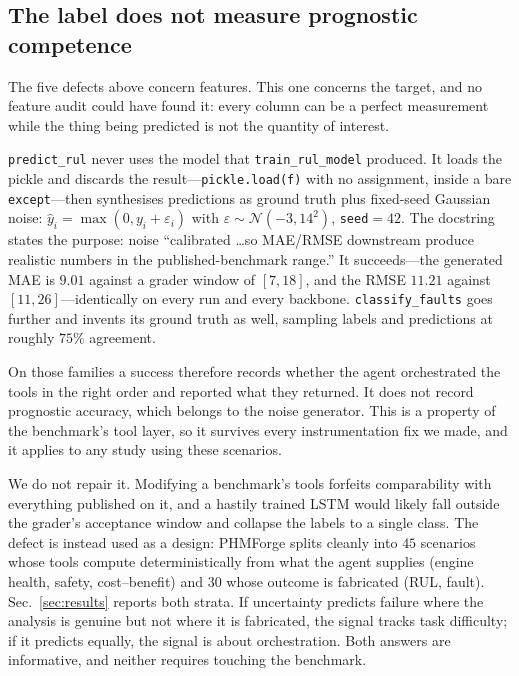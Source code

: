 \documentclass[conference]{IEEEtran}
\begin{document}
\subsection{The label does not measure prognostic competence}
\label{sec:label}

The five defects above concern features. This one concerns the target, and no
feature audit could have found it: every column can be a perfect measurement
while the thing being predicted is not the quantity of interest.

\texttt{predict\_rul} never uses the model that \texttt{train\_rul\_model}
produced. It loads the pickle and discards the result---\texttt{pickle.load(f)}
with no assignment, inside a bare \texttt{except}---then synthesises predictions
as ground truth plus fixed-seed Gaussian noise:
$\hat{y}_i = \max(0, y_i + \varepsilon_i)$ with
$\varepsilon \sim \mathcal{N}(-3, 14^2)$, \texttt{seed}${=}42$. The docstring
states the purpose: noise ``calibrated \ldots so MAE/RMSE downstream produce
realistic numbers in the published-benchmark range.'' It succeeds---the
generated MAE is $9.01$ against a grader window of $[7, 18]$, and the RMSE
$11.21$ against $[11, 26]$---identically on every run and every backbone.
\texttt{classify\_faults} goes further and invents its ground truth as well,
sampling labels and predictions at roughly $75\%$ agreement.

On those families a success therefore records whether the agent orchestrated the
tools in the right order and reported what they returned. It does not record
prognostic accuracy, which belongs to the noise generator. This is a property of
the benchmark's tool layer, so it survives every instrumentation fix we made,
and it applies to any study using these scenarios.

We do not repair it. Modifying a benchmark's tools forfeits comparability with
everything published on it, and a hastily trained LSTM would likely fall outside
the grader's acceptance window and collapse the labels to a single class. The
defect is instead used as a design: PHMForge splits cleanly into $45$ scenarios
whose tools compute deterministically from what the agent supplies (engine
health, safety, cost--benefit) and $30$ whose outcome is fabricated (RUL, fault).
Sec.~\ref{sec:results} reports both strata. If uncertainty predicts failure where
the analysis is genuine but not where it is fabricated, the signal tracks task
difficulty; if it predicts equally, the signal is about orchestration. Both
answers are informative, and neither requires touching the benchmark.
\end{document}
